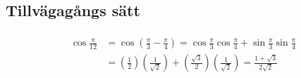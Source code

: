 \begin{multicols}{2}
\subsection{Tillvägagångs sätt}
\begin{align*}
  \begin{aligned} \cos \frac { \pi } { 12 } & = \cos \left( \frac { \pi } { 3 } - \frac { \pi } { 4 } \right) = \cos \frac { \pi } { 3 } \cos \frac { \pi } { 4 } + \sin \frac { \pi } { 3 } \sin \frac { \pi } { 4 } \\ & = \left( \frac { 1 } { 2 } \right) \left( \frac { 1 } { \sqrt { 2 } } \right) + \left( \frac { \sqrt { 3 } } { 2 } \right) \left( \frac { 1 } { \sqrt { 2 } } \right) = \frac { 1 + \sqrt { 3 } } { 2 \sqrt { 2 } } \end{aligned}
\end{align*}
\end{multicols}
\raggedcolumns